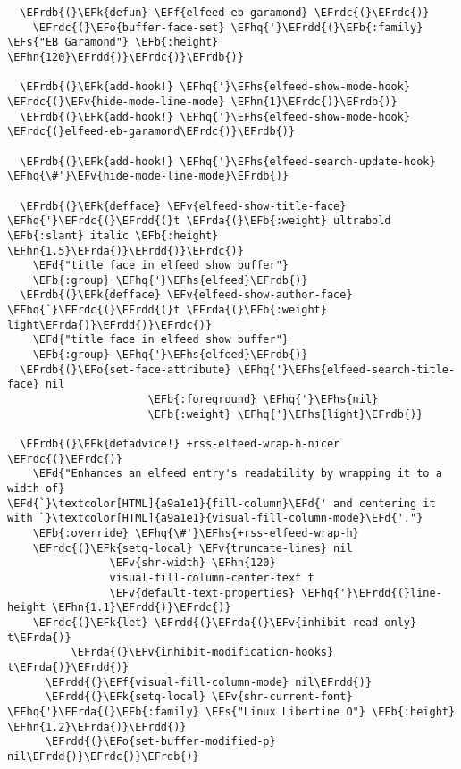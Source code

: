 \documentclass[a4wide,10pt]{article}
\newcommand{\EFs}[1]{\textcolor{EFs}{#1}} %
\newcommand{\EFd}[1]{\textcolor{EFd}{#1}} %
\newcommand{\EFk}[1]{\textcolor{EFk}{#1}} %
\newcommand{\EFb}[1]{\textcolor{EFb}{#1}} %
\newcommand{\EFf}[1]{\textcolor{EFf}{#1}} %
\newcommand{\EFv}[1]{\textcolor{EFv}{#1}} %
\newcommand{\EFo}[1]{\textcolor{EFo}{#1}} %
\newcommand{\EFhn}[1]{\textcolor{EFhn}{\textbf{#1}}} %
\newcommand{\EFhq}[1]{\textcolor{EFhq}{#1}} %
\newcommand{\EFhs}[1]{\textcolor{EFhs}{#1}} %
\newcommand{\EFrda}[1]{\textcolor{EFrda}{#1}} %
\newcommand{\EFrdb}[1]{\textcolor{EFrdb}{#1}} %
\newcommand{\EFrdc}[1]{\textcolor{EFrdc}{#1}} %
\newcommand{\EFrdd}[1]{\textcolor{EFrdd}{#1}} %
\begin{document}
\begin{Code}
\begin{Verbatim}
  \EFrdb{(}\EFk{defun} \EFf{elfeed-eb-garamond} \EFrdc{(}\EFrdc{)}
    \EFrdc{(}\EFo{buffer-face-set} \EFhq{'}\EFrdd{(}\EFb{:family} \EFs{"EB Garamond"} \EFb{:height} \EFhn{120}\EFrdd{)}\EFrdc{)}\EFrdb{)}

  \EFrdb{(}\EFk{add-hook!} \EFhq{'}\EFhs{elfeed-show-mode-hook} \EFrdc{(}\EFv{hide-mode-line-mode} \EFhn{1}\EFrdc{)}\EFrdb{)}
  \EFrdb{(}\EFk{add-hook!} \EFhq{'}\EFhs{elfeed-show-mode-hook} \EFrdc{(}elfeed-eb-garamond\EFrdc{)}\EFrdb{)}

  \EFrdb{(}\EFk{add-hook!} \EFhq{'}\EFhs{elfeed-search-update-hook} \EFhq{\#'}\EFv{hide-mode-line-mode}\EFrdb{)}

  \EFrdb{(}\EFk{defface} \EFv{elfeed-show-title-face} \EFhq{'}\EFrdc{(}\EFrdd{(}t \EFrda{(}\EFb{:weight} ultrabold \EFb{:slant} italic \EFb{:height} \EFhn{1.5}\EFrda{)}\EFrdd{)}\EFrdc{)}
    \EFd{"title face in elfeed show buffer"}
    \EFb{:group} \EFhq{'}\EFhs{elfeed}\EFrdb{)}
  \EFrdb{(}\EFk{defface} \EFv{elfeed-show-author-face} \EFhq{`}\EFrdc{(}\EFrdd{(}t \EFrda{(}\EFb{:weight} light\EFrda{)}\EFrdd{)}\EFrdc{)}
    \EFd{"title face in elfeed show buffer"}
    \EFb{:group} \EFhq{'}\EFhs{elfeed}\EFrdb{)}
  \EFrdb{(}\EFo{set-face-attribute} \EFhq{'}\EFhs{elfeed-search-title-face} nil
                      \EFb{:foreground} \EFhq{'}\EFhs{nil}
                      \EFb{:weight} \EFhq{'}\EFhs{light}\EFrdb{)}

  \EFrdb{(}\EFk{defadvice!} +rss-elfeed-wrap-h-nicer \EFrdc{(}\EFrdc{)}
    \EFd{"Enhances an elfeed entry's readability by wrapping it to a width of}
\EFd{`}\textcolor[HTML]{a9a1e1}{fill-column}\EFd{' and centering it with `}\textcolor[HTML]{a9a1e1}{visual-fill-column-mode}\EFd{'."}
    \EFb{:override} \EFhq{\#'}\EFhs{+rss-elfeed-wrap-h}
    \EFrdc{(}\EFk{setq-local} \EFv{truncate-lines} nil
                \EFv{shr-width} \EFhn{120}
                visual-fill-column-center-text t
                \EFv{default-text-properties} \EFhq{'}\EFrdd{(}line-height \EFhn{1.1}\EFrdd{)}\EFrdc{)}
    \EFrdc{(}\EFk{let} \EFrdd{(}\EFrda{(}\EFv{inhibit-read-only} t\EFrda{)}
          \EFrda{(}\EFv{inhibit-modification-hooks} t\EFrda{)}\EFrdd{)}
      \EFrdd{(}\EFf{visual-fill-column-mode} nil\EFrdd{)}
      \EFrdd{(}\EFk{setq-local} \EFv{shr-current-font} \EFhq{'}\EFrda{(}\EFb{:family} \EFs{"Linux Libertine O"} \EFb{:height} \EFhn{1.2}\EFrda{)}\EFrdd{)}
      \EFrdd{(}\EFo{set-buffer-modified-p} nil\EFrdd{)}\EFrdc{)}\EFrdb{)}


\end{Verbatim}
\end{Code}
\end{document}

